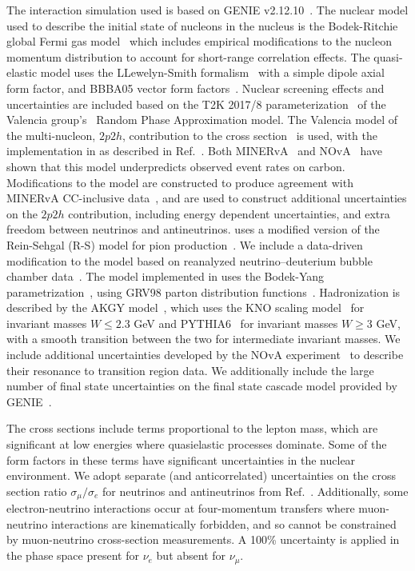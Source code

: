 The interaction simulation used is based on GENIE v2.12.10~\cite{Andreopoulos:2009rq,Andreopoulos:2015wxa}. The nuclear model used to describe the initial state of nucleons in the nucleus is the Bodek-Ritchie global Fermi gas model~\cite{BodekRitchie} which includes empirical modifications to the nucleon momentum distribution to account for short-range correlation effects. The quasi-elastic model uses the LLewelyn-Smith formalism~\cite{llewelyn-smith} with a simple dipole axial form factor, and BBBA05 vector form factors~\cite{bbba05}. Nuclear screening effects and uncertainties are included based on the T2K 2017/8 parameterization~\cite{Abe:2018wpn} of the Valencia group's~\cite{nieves1,nieves2} Random Phase Approximation model. The Valencia model of the multi-nucleon, $2p2h$, contribution to the cross section~\cite{nieves1,nieves2} is used, with the implementation in  as described in Ref.~\cite{Schwehr:2016pvn}. Both MINERvA~\cite{Rodrigues:2015hik} and NOvA~\cite{NOvA:2018gge} have shown that this model underpredicts observed event rates on carbon. Modifications to the model are constructed to produce agreement with MINERvA CC-inclusive data~\cite{Rodrigues:2015hik}, and are used to construct additional uncertainties on the $2p2h$ contribution, including energy dependent uncertainties, and extra freedom between neutrinos and antineutrinos.  uses a modified version of the Rein-Sehgal (R-S) model for pion production~\cite{Rein:1980wg}. We include a data-driven modification to the  model based on reanalyzed neutrino--deuterium bubble chamber data~\cite{Wilkinson:2014yfa,Rodrigues:2016xjj}. The  model implemented in  uses the Bodek-Yang parametrization~\cite{Bodek:2002ps}, using GRV98 parton distribution functions~\cite{Gluck:1998xa}. Hadronization is described by the AKGY model~\cite{Yang:2009zx}, which uses the KNO scaling model~\cite{Koba:1972ng} for invariant masses $W \leq 2.3$ GeV and PYTHIA6~\cite{Sjostrand:2006za} for invariant masses $W \geq 3$ GeV, with a smooth transition between the two for intermediate invariant masses. We include additional uncertainties developed by the NOvA experiment~\cite{nova_2018} to describe their resonance to  transition region data. We additionally include the large number of final state uncertainties on the final state cascade model provided by GENIE~\cite{Dytman:2011zz,Dytman:2015taa,intranuke_2009}.

The cross sections include terms proportional to the lepton mass, which are significant at low energies where quasielastic processes dominate. Some of the form factors in these terms have significant uncertainties in the nuclear environment. We adopt separate (and anticorrelated) uncertainties on the cross section ratio $\sigma_\mu/\sigma_e$ for neutrinos and antineutrinos from Ref.~\cite{Day:2012gb}. Additionally, some electron-neutrino interactions occur at four-momentum transfers where muon-neutrino interactions are kinematically forbidden, and so cannot be constrained by muon-neutrino cross-section measurements. A 100\% uncertainty is applied in the phase space present for $\nu_e$ but absent for $\nu_\mu$.

%
%
%
%
